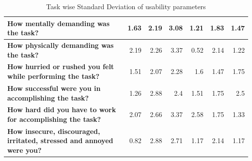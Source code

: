 \documentclass[english]{tktltiki}
\begin{document}
\begin{table}
\begin{center}
\begin{tabular}{|p{6cm}|r|r|r|r|r|r|}
        \textbf{How mentally demanding was the task?} & 1.63 & 2.19 & 3.08 & 1.21 & 1.83 & 1.47 \\
        \hline
        
        \textbf{How physically demanding was the task?} & 2.19 & 2.26 & 3.37 & 0.52 & 2.14 & 1.22 \\
        \hline
        
        \textbf{How hurried or rushed you felt while performing the task?} & 1.51 & 2.07 & 2.28 & 1.6 & 1.47 & 1.75 \\
        \hline
        
        \textbf{How successful were you in accomplishing the task?} & 1.26 & 2.88 & 2.4 & 1.51 & 1.75 & 2.5 \\
        \hline
        
        \textbf{How hard did you have to work for accomplishing the task?} & 2.07 & 2.66 & 3.37 & 2.58 & 1.75 & 1.33 \\
        \hline
        
        \textbf{How insecure, discouraged, irritated, stressed and annoyed were you?} & 0.82 & 2.88 & 2.71 & 1.17 & 2.14 & 1.17 \\
        \hline
        
    \end{tabular}
	\end{center}
	\caption{Task wise Standard Deviation of usability parameters}
    \label{table:use_std_task}
\end{table}

\fi

\end{document}
